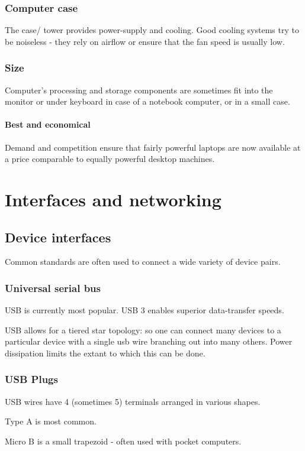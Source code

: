\documentclass[oneside, article]{memoir}
\begin{document}
\subsection{Computer case}
The case/ tower provides power-supply and cooling. Good cooling systems try to be noiseless - they rely on airflow or ensure that the fan speed is usually low.

\subsection{Size}
Computer's processing and storage components are sometimes fit into the monitor or under keyboard in case of a notebook computer, or in a small case.

\subsubsection{Best and economical}
Demand and competition ensure that fairly powerful laptops are now available at a price comparable to equally powerful desktop machines.

\chapter{Interfaces and networking}
\section{Device interfaces}
Common standards are often used to connect a wide variety of device pairs.

\subsection{Universal serial bus}
USB is currently most popular. USB 3 enables superior data-transfer speeds.

USB allows for a tiered star topology: so one can connect many devices to a particular device with a single usb wire branching out into many others. Power dissipation limits the extant to which this can be done.

\subsection{USB Plugs}
USB wires have 4 (sometimes 5) terminals arranged in various shapes.

Type A is most common.

Micro B is a small trapezoid - often used with pocket computers.
\end{document}
